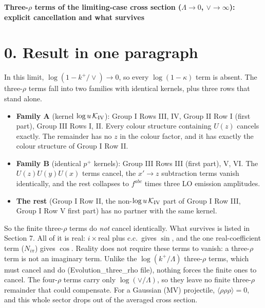 \documentclass[10pt]{article}
\begin{document}
\begin{center}{\large\bf Three-$\rho$ terms of the limiting-case cross section ($\Lambda\to0$, $\vee\to\infty$):\\ explicit cancellation and what survives}\end{center}

\section*{0. Result in one paragraph}
In this limit, $\log(1-k^{+}/\vee)\to0$, so every $\log(1-\kappa)$ term is absent. The three-$\rho$ terms fall into two families with identical kernels, plus three rows that stand alone.
\begin{itemize}
\item \textbf{Family A} (kernel $\log u\,\mathcal K_{\rm IV}$): Group I Rows III, IV, Group II Row I (first part), Group III Rows I, II. Every colour structure containing $U(z)$ cancels exactly. The remainder has no $z$ in the colour factor, and it has exactly the colour structure of Group I Row II.
\item \textbf{Family B} (identical $p^{+}$ kernels): Group III Rows III (first part), V, VI. The $U(z)U(y)U(x)$ terms cancel, the $x'\to z$ subtraction terms vanish identically, and the rest collapses to $f^{abc}$ times three LO emission amplitudes.
\item \textbf{The rest} (Group I Row II, the non-$\log u\,\mathcal K_{\rm IV}$ part of Group I Row III, Group I Row V first part) has no partner with the same kernel.
\end{itemize}
So the finite three-$\rho$ terms do \emph{not} cancel identically. What survives is listed in Section 7. All of it is real: $i\times$real plus c.c.\ gives $\sin$, and the one real-coefficient term ($N_{i\pi}$) gives $\cos$. Reality does not require these terms to vanish: a three-$\rho$ term is not an imaginary term. Unlike the $\log(k^{+}/\Lambda)$ three-$\rho$ terms, which must cancel and do (Evolution\_three\_rho file), nothing forces the finite ones to cancel. The four-$\rho$ terms carry only $\log(\vee/\Lambda)$, so they leave no finite three-$\rho$ remainder that could compensate. For a Gaussian (MV) projectile, $\langle\rho\rho\rho\rangle=0$, and this whole sector drops out of the averaged cross section.
\end{document}
